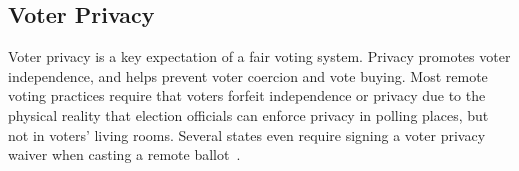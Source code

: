 
\subsection{Voter Privacy}

Voter privacy is a key expectation of a fair voting system. Privacy
promotes voter independence, and helps prevent voter coercion and vote
buying. Most remote voting practices require that voters forfeit
independence or privacy due to the physical reality that election
officials can enforce privacy in polling places, but not in voters'
living rooms. Several states even require signing a voter privacy
waiver when casting a remote ballot~\cite{smithtime}.



